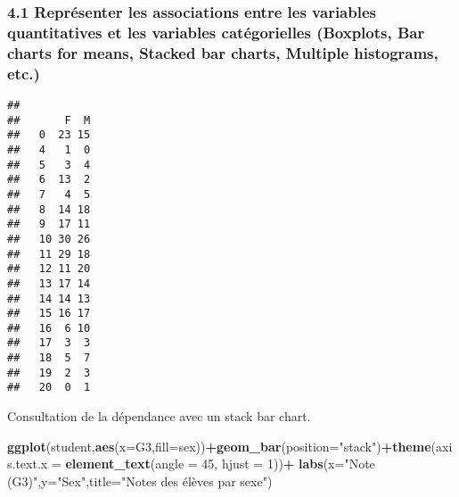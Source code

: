 \documentclass[
]{article}
\newenvironment{Shaded}{\begin{snugshade}}{\end{snugshade}}
\newcommand{\DataTypeTok}[1]{\textcolor[rgb]{0.13,0.29,0.53}{#1}}
\newcommand{\DecValTok}[1]{\textcolor[rgb]{0.00,0.00,0.81}{#1}}
\newcommand{\KeywordTok}[1]{\textcolor[rgb]{0.13,0.29,0.53}{\textbf{#1}}}
\newcommand{\NormalTok}[1]{#1}
\newcommand{\OperatorTok}[1]{\textcolor[rgb]{0.81,0.36,0.00}{\textbf{#1}}}
\newcommand{\StringTok}[1]{\textcolor[rgb]{0.31,0.60,0.02}{#1}}
\begin{document}
\hypertarget{repruxe9senter-les-associations-entre-les-variables-quantitatives-et-les-variables-catuxe9gorielles-boxplots-bar-charts-for-means-stacked-bar-charts-multiple-histograms-etc.}{%
\subsubsection{4.1 Représenter les associations entre les variables
quantitatives et les variables catégorielles (Boxplots, Bar charts for
means, Stacked bar charts, Multiple histograms,
etc.)}\label{repruxe9senter-les-associations-entre-les-variables-quantitatives-et-les-variables-catuxe9gorielles-boxplots-bar-charts-for-means-stacked-bar-charts-multiple-histograms-etc.}}

\begin{Shaded}
\end{Shaded}

\begin{verbatim}
##     
##       F  M
##   0  23 15
##   4   1  0
##   5   3  4
##   6  13  2
##   7   4  5
##   8  14 18
##   9  17 11
##   10 30 26
##   11 29 18
##   12 11 20
##   13 17 14
##   14 14 13
##   15 16 17
##   16  6 10
##   17  3  3
##   18  5  7
##   19  2  3
##   20  0  1
\end{verbatim}

Consultation de la dépendance avec un stack bar chart.

\begin{Shaded}
\begin{Highlighting}[]
\KeywordTok{ggplot}\NormalTok{(student,}\KeywordTok{aes}\NormalTok{(}\DataTypeTok{x=}\NormalTok{G3,}\DataTypeTok{fill=}\NormalTok{sex))}\OperatorTok{+}\KeywordTok{geom_bar}\NormalTok{(}\DataTypeTok{position=}\StringTok{"stack"}\NormalTok{)}\OperatorTok{+}\KeywordTok{theme}\NormalTok{(}\DataTypeTok{axis.text.x =} \KeywordTok{element_text}\NormalTok{(}\DataTypeTok{angle =} \DecValTok{45}\NormalTok{, }\DataTypeTok{hjust =} \DecValTok{1}\NormalTok{))}\OperatorTok{+}
\StringTok{  }\KeywordTok{labs}\NormalTok{(}\DataTypeTok{x=}\StringTok{"Note (G3)"}\NormalTok{,}\DataTypeTok{y=}\StringTok{"Sex"}\NormalTok{,}\DataTypeTok{title=}\StringTok{"Notes des élèves par sexe"}\NormalTok{)}
\end{Highlighting}
\end{Shaded}
\end{document}
